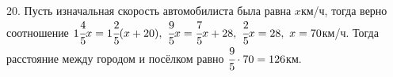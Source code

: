 20. Пусть изначальная скорость автомобилиста была равна $x$км/ч, тогда верно соотношение $1\cfrac{4}{5}x=1\cfrac{2}{5}(x+20),\ \cfrac{9}{5}x=\cfrac{7}{5}x+28,\
\cfrac{2}{5}x=28,\ x=70$км/ч. Тогда расстояние между городом и посёлком равно $\cfrac{9}{5}\cdot70=126$км.\\
